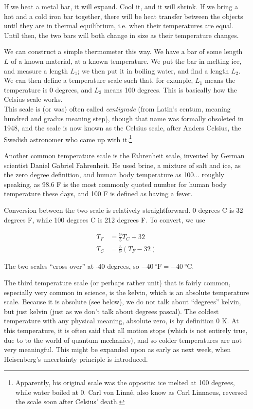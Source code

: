If we heat a metal bar, it will expand. Cool it, and it will shrink. If we bring a hot and a cold iron bar together, there will be heat transfer between the objects until they are in thermal equilibrium, i.e. when their temperatures are equal. Until then, the two bars will both change in size as their temperature changes.

We can construct a simple thermometer this way. We have a bar of some length $L$ of a known material, at a known temperature. We put the bar in melting ice, and measure a length $L_1$; we then put it in boiling water, and find a length $L_2$. We can then define a temperature scale such that, for example, $L_1$ means the temperature is 0 degrees, and $L_2$ means 100 degrees. This is basically how the Celsius scale works.\\
This scale is (or was) often called \emph{centigrade} (from Latin's centum, meaning hundred and gradus meaning step), though that name was formally obsoleted in 1948, and the scale is now known as the Celsius scale, after Anders Celsius, the Swedish astronomer who came up with it.\footnote{Apparently, his original scale was the opposite: ice melted at 100 degrees, while water boiled at 0. Carl von Linn\'e, also know as Carl Linnaeus, reversed the scale soon after Celsius' death.}

Another common temperature scale is the Fahrenheit scale, invented by German scientist Daniel Gabriel Fahrenheit. He used brine, a mixture of salt and ice, as the zero degree definition, and human body temperature as 100... roughly speaking, as 98.6 F is the most commonly quoted number for human body temperature these days, and 100 F is defined as having a fever.

Conversion between the two scale is relatively straightforward. 0 degrees C is 32 degrees F, while 100 degrees C is 212 degrees F. To convert, we use

\begin{align}
T_F &= \frac{9}{5} T_C + 32\\
T_C &= \frac{5}{9} \left(T_F - 32\right)
\end{align}

The two scales ``cross over'' at -40 degrees, so $\SI{-40}{{}^\circ\text{F}} = \SI{-40}{\degreeCelsius}$.

The third temperature scale (or perhaps rather unit) that is fairly common, especially very common in science, is the kelvin, which is an absolute temperature scale. Because it is absolute (see below), we do not talk about ``degrees'' kelvin, but just kelvin (just as we don't talk about degrees pascal).
The coldest temperature with any physical meaning, absolute zero, is by definition 0 K. At this temperature, it is often said that all motion stops (which is not entirely true, due to to the world of quantum mechanics), and so colder temperatures are not very meaningful. This might be expanded upon as early as next week, when Heisenberg's uncertainty principle is introduced.

